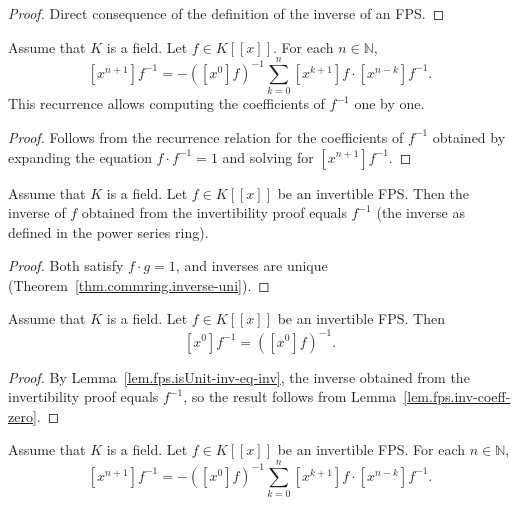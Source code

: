 \begin{proof}
Direct consequence of the definition of the inverse of an FPS.
\end{proof}

\begin{lemma}
\label{lem.fps.inv-coeff-succ}
\leanhelper
\leanok
Assume that $K$ is a field. Let $f\in K[[x]]$. For each $n\in\mathbb{N}$,
\[
\left[x^{n+1}\right]f^{-1}
= -\left(\left[x^{0}\right]f\right)^{-1}\sum_{k=0}^{n}\left[x^{k+1}\right]f\cdot
\left[x^{n-k}\right]f^{-1}.
\]
This recurrence allows computing the coefficients of $f^{-1}$ one by one.
\end{lemma}

\begin{proof}
Follows from the recurrence relation for the coefficients of $f^{-1}$ obtained
by expanding the equation $f\cdot f^{-1}=1$ and solving for $[x^{n+1}]f^{-1}$.
\end{proof}

\begin{lemma}
\label{lem.fps.isUnit-inv-eq-inv}
\leanhelper
\leanok
Assume that $K$ is a field. Let $f\in K[[x]]$ be an invertible FPS.
Then the inverse of $f$ obtained from the invertibility proof equals
$f^{-1}$ (the inverse as defined in the power series ring).
\end{lemma}

\begin{proof}
\leanok
Both satisfy $f\cdot g = 1$, and inverses are unique
(Theorem~\ref{thm.commring.inverse-uni}).
\end{proof}

\begin{lemma}
\label{lem.fps.inv-coeff-zero-isUnit}
\leanhelper
\leanok
Assume that $K$ is a field. Let $f\in K[[x]]$ be an invertible FPS. Then
\[
\left[x^{0}\right]f^{-1} = \left(\left[x^{0}\right]f\right)^{-1}.
\]
\end{lemma}

\begin{proof}
\leanok
By Lemma~\ref{lem.fps.isUnit-inv-eq-inv}, the inverse obtained from
the invertibility proof equals $f^{-1}$,
so the result follows from Lemma~\ref{lem.fps.inv-coeff-zero}.
\end{proof}

\begin{lemma}
\label{lem.fps.inv-coeff-succ-isUnit}
\leanhelper
\leanok
Assume that $K$ is a field. Let $f\in K[[x]]$ be an invertible FPS. For each
$n\in\mathbb{N}$,
\[
\left[x^{n+1}\right]f^{-1}
= -\left(\left[x^{0}\right]f\right)^{-1}\sum_{k=0}^{n}\left[x^{k+1}\right]f\cdot
\left[x^{n-k}\right]f^{-1}.
\]
\end{lemma}

